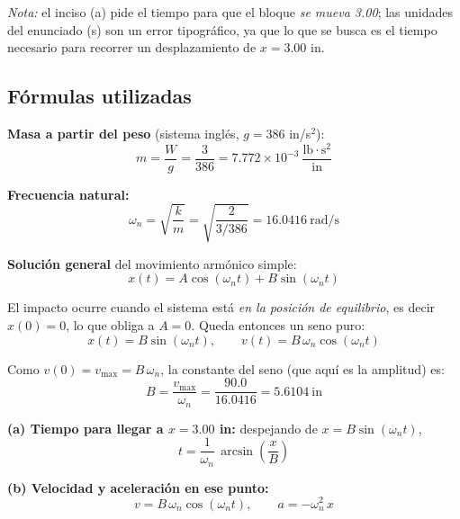 \documentclass[12pt,letterpaper]{article}
\begin{document}
\noindent\emph{Nota:} el inciso (a) pide el tiempo para que el bloque \emph{se mueva
3.00}; las unidades del enunciado (s) son un error tipográfico, ya que lo que se busca
es el tiempo necesario para recorrer un desplazamiento de $x = 3.00$ in.

\subsection{Fórmulas utilizadas}

\textbf{Masa a partir del peso} (sistema inglés, $g = 386$ in/s$^2$):
\begin{equation}
m = \frac{W}{g} = \frac{3}{386} = 7.772\times10^{-3}\ \frac{\text{lb}\cdot\text{s}^2}{\text{in}}
\end{equation}

\textbf{Frecuencia natural:}
\begin{equation}
\omega_n = \sqrt{\frac{k}{m}} = \sqrt{\frac{2}{3/386}} = 16.0416\ \text{rad/s}
\end{equation}

\textbf{Solución general} del movimiento armónico simple:
\begin{equation}
x(t) = A\cos(\omega_n t) + B\sin(\omega_n t)
\end{equation}

El impacto ocurre cuando el sistema está \emph{en la posición de equilibrio}, es decir
$x(0) = 0$, lo que obliga a $A = 0$. Queda entonces un seno puro:
\begin{equation}
x(t) = B\sin(\omega_n t), \qquad v(t) = B\,\omega_n\cos(\omega_n t)
\end{equation}

Como $v(0) = v_{\max} = B\,\omega_n$, la constante del seno (que aquí es la amplitud) es:
\begin{equation}
\boxed{\;B = \frac{v_{\max}}{\omega_n} = \frac{90.0}{16.0416} = 5.6104\ \text{in}\;}
\end{equation}

\textbf{(a) Tiempo para llegar a $x = 3.00$ in:} despejando de $x = B\sin(\omega_n t)$,
\begin{equation}
t = \frac{1}{\omega_n}\,\arcsin\!\left(\frac{x}{B}\right)
\end{equation}

\textbf{(b) Velocidad y aceleración en ese punto:}
\begin{equation}
v = B\,\omega_n\cos(\omega_n t), \qquad a = -\omega_n^{2}\,x
\end{equation}
\end{document}
